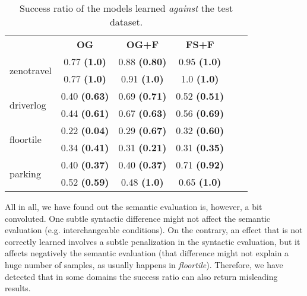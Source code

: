 \documentclass{ecai}
\begin{document}
\begin{table}
	\caption{Success ratio of the models learned \textit{against} the test dataset.}
	\begin{center}
		{\scriptsize 
			\begin{tabular}{lccccc}
				& \textbf{OG} & \textbf{OG+F} & \textbf{FS+F} \\
				\cline{2-4}
		\multirow{2}{*}{zenotravel} & 0.77 \textbf{(1.0)}	& 0.88 \textbf{(0.80)} & 0.95  \textbf{(1.0)}\\
		& 0.77 \textbf{(1.0)} & 0.91 \textbf{(1.0)} & 1.0 \textbf{(1.0)} \\
		
		\cline{2-4}
	
		\multirow{2}{*}{driverlog} & 0.40 \textbf{(0.63)} & 0.69 \textbf{(0.71)} & 0.52 \textbf{(0.51)} \\	
		& 0.44 \textbf{(0.61)} & 0.67 \textbf{(0.63)} & 0.56 \textbf{(0.69)} \\
										
		\cline{2-4}
		
		\multirow{2}{*}{floortile} & 0.22 \textbf{(0.04)} & 0.29 \textbf{(0.67)} & 0.32 \textbf{(0.60)} \\
		& 0.34 \textbf{(0.41)} &  0.31 \textbf{(0.21)} & 0.31 \textbf{(0.35)} \\
		
		\cline{2-4}
		
		\multirow{2}{*}{parking} & 0.40 \textbf{(0.37)} & 0.40 \textbf{(0.37)} & 0.71 \textbf{(0.92)} \\	
		& 0.52 \textbf{(0.59)} & 0.48 \textbf{(1.0)} & 0.65 \textbf{(1.0)} \\
		
			\hline
			\end{tabular}
}
	\label{table:SemanticResults}
\end{center}
\end{table}


All in all, we have found out the semantic evaluation is, however, a bit convoluted. One subtle syntactic difference might not affect the semantic evaluation (e.g. interchangeable conditions). On the contrary, an effect that is not correctly learned involves a subtle penalization in the syntactic evaluation, but it affects negatively the semantic evaluation (that difference might not explain a huge number of samples, as usually happens in \textit{floortile}). Therefore, we have detected that in some domains the success ratio can also return misleading results.
\end{document}
